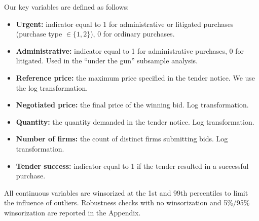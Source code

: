 Our key variables are defined as follows:
\begin{itemize}
  \item \textbf{Urgent:} indicator equal to 1 for administrative or litigated purchases (purchase type $\in \{1,2\}$), 0 for ordinary purchases.
  \item \textbf{Administrative:} indicator equal to 1 for administrative purchases, 0 for litigated. Used in the ``under the gun'' subsample analysis.
  \item \textbf{Reference price:} the maximum price specified in the tender notice. We use the log transformation.
  \item \textbf{Negotiated price:} the final price of the winning bid. Log transformation.
  \item \textbf{Quantity:} the quantity demanded in the tender notice. Log transformation.
  \item \textbf{Number of firms:} the count of distinct firms submitting bids. Log transformation.
  \item \textbf{Tender success:} indicator equal to 1 if the tender resulted in a successful purchase.
\end{itemize}

All continuous variables are winsorized at the 1st and 99th percentiles to limit the influence of outliers. Robustness checks with no winsorization and 5\%/95\% winsorization are reported in the Appendix.
